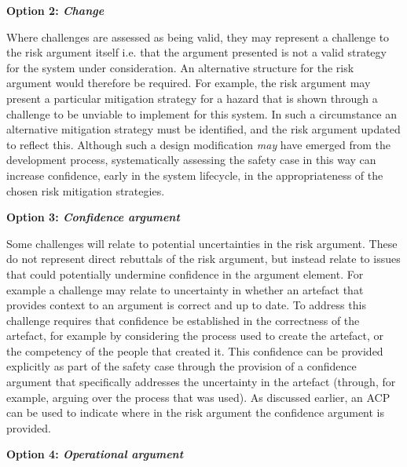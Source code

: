 \textbf{Option 2: \textbf{\textit{Change}}} 

Where challenges are assessed as being valid, they may represent a challenge to the risk argument itself i.e. that the argument presented is not a valid strategy for the system under consideration. An alternative structure for the risk argument would therefore be required. For example, the risk argument may present a particular mitigation strategy for a hazard that is shown through a challenge to be unviable to implement for this system. In such a circumstance an alternative mitigation strategy must be identified, and the risk argument updated to reflect this.
Although such a design modification \textit{may} have emerged from the development process, systematically assessing the safety case in this way can increase confidence, early in the system lifecycle, in the appropriateness of the chosen risk mitigation strategies.


\textbf{Option 3: {\textit{Confidence argument}}} 

Some challenges will relate to potential uncertainties in the risk argument. These do not represent direct rebuttals of the risk argument, but instead relate to issues that could potentially undermine confidence in the argument element. For example a challenge may relate to uncertainty in whether an artefact that provides context to an argument is correct and up to date. To address this challenge requires that confidence be established in the correctness of the artefact, for example by considering the process used to create the artefact, or the competency of the people that created it. This confidence can be provided explicitly as part of the safety case through the provision of a confidence argument that specifically addresses the uncertainty in the artefact (through, for example, arguing over the process that was used). As discussed earlier, an ACP can be used to indicate where in the risk argument the confidence argument is provided.

\textbf{Option 4: \textit{Operational argument}} 

